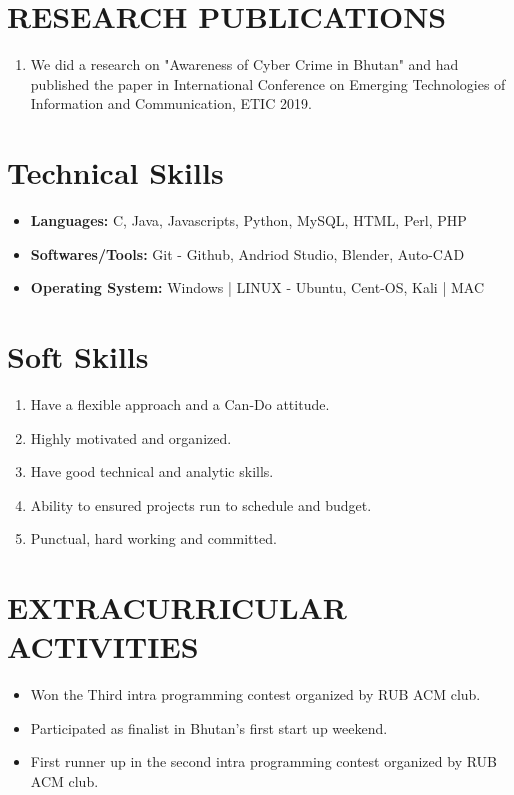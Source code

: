 \documentclass[10pt]{article}
\begin{document}
	\section{RESEARCH PUBLICATIONS}
	\begin{enumerate}
		\item We did a research on "Awareness of Cyber Crime in Bhutan" and had published the paper in International Conference on Emerging Technologies of Information and Communication, ETIC 2019.
	\end{enumerate}

	\section{Technical Skills}
	\begin{itemize}
		\item {\bf Languages: } C, Java, Javascripts, Python, MySQL,  HTML, Perl, PHP
		\item  {\bf Softwares/Tools: } Git - Github, Andriod Studio, Blender, Auto-CAD
		\item  {\bf Operating System: } Windows | LINUX - Ubuntu, Cent-OS, Kali | MAC
	\end{itemize}

	\section{Soft Skills}
	\begin{enumerate}
		\item  {Have a flexible approach and a Can-Do attitude. }
		\item  {Highly motivated and organized. }
		\item  {Have good technical and analytic skills. }
		\item  {Ability to ensured projects run to schedule and budget.}
		\item  {Punctual, hard working and committed.}
	\end{enumerate}

	\section{EXTRACURRICULAR ACTIVITIES}
	\begin{itemize}
		\item {Won the Third intra programming contest organized by RUB ACM club. }
		\item  {Participated as finalist in Bhutan’s first start up weekend. }
		\item  {First runner up in the second intra programming contest organized by RUB ACM club. }
	\end{itemize}
	
\end{document}
